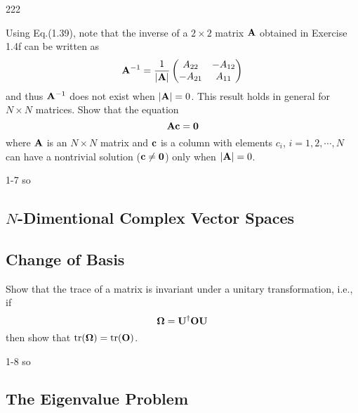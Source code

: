 \documentclass[a4paper]{book}
\newcommand\tr[1]{\mathrm{tr(#1)}}
\newcommand{\A}{{\bf A}}
\newcommand{\U}{{\bf U}}
\newcommand{\Op}{{\bf O}}
\begin{document}
	\begin{solution}
		222
	\end{solution}
	
	\begin{exercise}
	Using Eq.(1.39), note that the inverse of a $2 \times 2$ matrix $\A$ obtained in Exercise 1.4f can be written as
	\begin{equation*}
		\A^{-1} = \frac{1}{|\A|}\begin{pmatrix} A_{22} & -A_{12} \\ -A_{21} & A_{11}	\end{pmatrix}
	\end{equation*}
	and thus $\A^{-1}$ does not exist when $|\A|=0$. This result holds in general for $N \times N$ matrices. Show that the equation
	\begin{equation*}
		\A {\bf c} = {\bf 0}
	\end{equation*}
	where $\A$ is an $N \times N$ matrix and ${\bf c}$ is a column with elements $c_i$, $i = 1,2,\cdots,N$ can have a nontrivial solution (${\bf c}\neq{\bf 0}$) only when $|\A|=0$.
	\end{exercise}
	
	\begin{solution}
		1-7 so
	\end{solution}	
	
	\subsection{\texorpdfstring{$N$}--Dimentional Complex Vector Spaces}
	
	\subsection{Change of Basis}
	
	\begin{exercise}
		Show that the trace of a matrix is invariant under a unitary transformation, i.e., if
		\begin{equation*}
			\bf{\Omega} = \U^\dagger \Op \U
		\end{equation*}
		then show that $\tr{\bf{\Omega}}=\tr{\Op}$.
	\end{exercise}
	
	\begin{solution}
		1-8 so
	\end{solution}
	
	\subsection{The Eigenvalue Problem}
	
\end{document}
